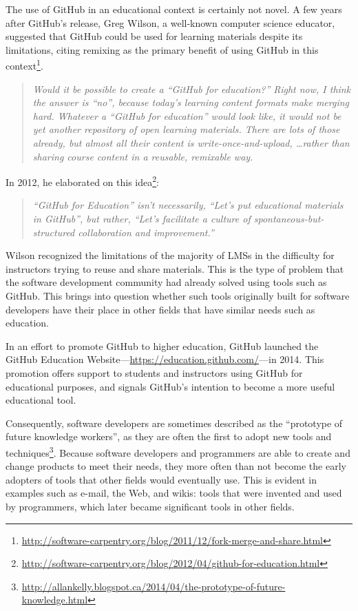 The use of GitHub in an educational context is certainly not novel. A few years after GitHub's release, Greg Wilson, a well-known computer science educator, suggested that GitHub could be used for learning materials despite its limitations, citing remixing as the primary benefit of using GitHub in this context\footnote{\url{http://software-carpentry.org/blog/2011/12/fork-merge-and-share.html}}.

\begin{quote}\textit{Would it be possible to create a ``GitHub for education?'' Right now, I think the answer is ``no'', because today's learning content formats make merging hard. Whatever a ``GitHub for education'' would look like, it would not be yet another repository of open learning materials. There are lots of those already, but almost all their content is write-once-and-upload, \ldots rather than sharing course content in a reusable, remixable way.}\end{quote}

In 2012, he elaborated on this idea\footnote{\url{http://software-carpentry.org/blog/2012/04/github-for-education.html}}:

\begin{quote}\textit{``GitHub for Education'' isn’t necessarily, ``Let’s put educational materials in GitHub'', but rather, ``Let’s facilitate a culture of spontaneous-but-structured collaboration and improvement.''}\end{quote}

Wilson recognized the limitations of the majority of LMSs in the difficulty for instructors trying to reuse and share materials. This is the type of problem that the software development community had already solved using tools such as GitHub. This brings into question whether such tools originally built for software developers have their place in other fields that have similar needs such as education.

In an effort to promote GitHub to higher education, GitHub launched the GitHub Education Website---\url{https://education.github.com/}---in 2014. This promotion offers support to students and instructors using GitHub for educational purposes, and signals GitHub's intention to become a more useful educational tool.

Consequently, software developers are sometimes described as the ``prototype of future knowledge workers'', as they are often the first to adopt new tools and techniques\footnote{\url{http://allankelly.blogspot.ca/2014/04/the-prototype-of-future-knowledge.html}}. Because software developers and programmers are able to create and change products to meet their needs, they more often than not become the early adopters of tools that other fields would eventually use. This is evident in examples such as e-mail, the Web, and wikis: tools that were invented and used by programmers, which later became significant tools in other fields.

